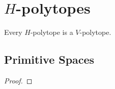 %

\section{$H$-polytopes}

\begin{definition}
    \label{def:h_polytope}
    
\end{definition}

\begin{proposition}
    \label{prop:h_is_v}
    Every $H$-polytope is a $V$-polytope.
\end{proposition}

\subsection{Primitive Spaces}

\begin{definition}
    \label{def:primspace}
    \leanok
\end{definition}

\begin{lemma}
    \label{lem:ambient_is_primspace}
    \leanok
\end{lemma}

\begin{proof}
    
\end{proof}

\begin{lemma}
    \label{lem:empty_is_primspace}
    \leanok
\end{lemma}

